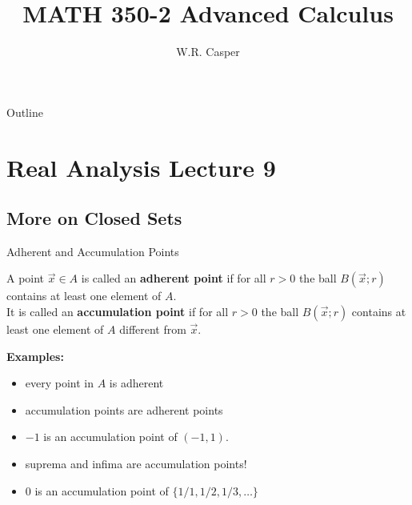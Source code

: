 \documentclass{beamer}
\title{MATH 350-2 Advanced Calculus}
\subtitle
{} %
\author[W.R. Casper] %
{W.R. Casper}
\institute[California State University Fullerton] %
{
  Department of Mathematics\\
  California State University Fullerton}
\begin{document}
\begin{frame}
  \titlepage
\end{frame}

\begin{frame}{Outline}
  \tableofcontents
\end{frame}



\section{Real Analysis Lecture 9}
\subsection{More on Closed Sets}

\begin{frame}{Adherent and Accumulation Points}
\begin{defn}
A point $\vec x\in A$ is called an \textbf{adherent point} if for all $r > 0$ the ball $B(\vec x; r)$ contains at least one element of $A$.\\
\pause
It is called an \textbf{accumulation point} if for all $r > 0$ the ball $B(\vec x; r)$ contains at least one element of $A$ {\color{red} different from $\vec x$}.
\end{defn}
\pause
\textbf{Examples:}
\begin{itemize}
\pause
\item every point in $A$ is adherent
\pause
\item accumulation points are adherent points
\pause
\item $-1$ is an accumulation point of $(-1,1)$.
\pause
\item suprema and infima are accumulation points!
\pause
\item $0$ is an accumulation point of $\{1/1,1/2,1/3,\dots\}$
\end{itemize}
\end{frame}
\end{document}
